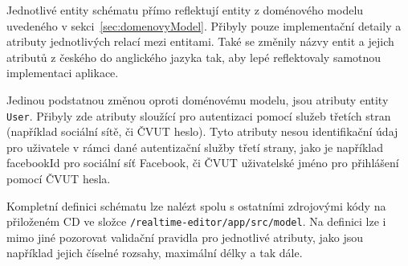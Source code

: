 Jednotlivé entity schématu přímo reflektují entity z doménového modelu uvedeného v sekci~\ref{sec:domenovyModel}.
Přibyly pouze implementační detaily a atributy jednotlivých relací mezi entitami.
Také se změnily názvy entit a jejich atributů z českého do anglického jazyka tak, aby lepé reflektovaly samotnou implementaci aplikace.

Jedinou podstatnou změnou oproti doménovému modelu, jsou atributy entity \texttt{User}.
Přibyly zde atributy sloužící pro autentizaci pomocí služeb třetích stran (například sociální sítě, či \acrshort{ČVUT} heslo).
Tyto atributy nesou identifikační údaj pro uživatele v rámci dané autentizační služby třetí strany, jako je například facebookId pro sociální síť Facebook, či \acrshort{ČVUT} uživatelské jméno pro přihlášení pomocí \acrshort{ČVUT} hesla.

Kompletní definici schématu lze nalézt spolu s ostatními zdrojovými kódy na přiloženém CD ve složce \texttt{/realtime-editor/app/src/model}.
Na definici lze i mimo jiné pozorovat validační pravidla pro jednotlivé atributy, jako jsou například jejich číselné rozsahy, maximální délky a tak dále.
